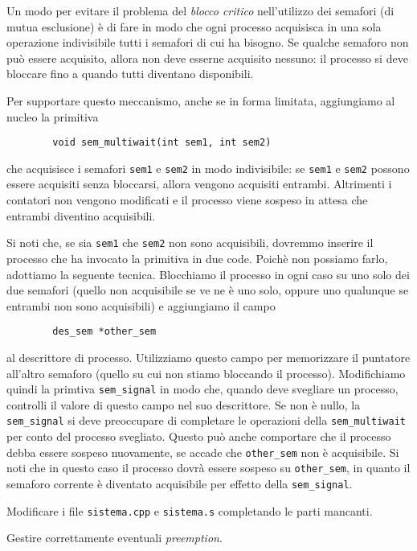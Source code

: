 Un modo per evitare il problema del {\em blocco critico} nell'utilizzo dei semafori (di mutua esclusione) \`e di
fare in modo che ogni processo acquisisca in una sola operazione indivisibile tutti i semafori di cui ha bisogno. Se qualche semaforo
non pu\`o essere acquisito, allora non deve esserne acquisito nessuno: il processo si deve bloccare fino a quando tutti
diventano disponibili.

Per supportare questo meccanismo, anche se in forma limitata, aggiungiamo al nucleo la primitiva

\begin{verbatim}
        void sem_multiwait(int sem1, int sem2)
\end{verbatim}

che acquisisce i semafori \verb|sem1| e \verb|sem2| in modo indivisibile: se \verb|sem1| e \verb|sem2| possono essere acquisiti
senza bloccarsi, allora vengono acquisiti entrambi. Altrimenti i contatori non vengono modificati e il processo viene sospeso
in attesa che entrambi diventino acquisibili.

Si noti che, se sia \verb|sem1| che \verb|sem2| non sono acquisibili, dovremmo inserire il processo che ha invocato la primitiva
in due code. Poich\`e non possiamo farlo, adottiamo la seguente tecnica. Blocchiamo il processo in ogni caso su uno solo dei
due semafori (quello non acquisibile se ve ne \`e uno solo, oppure uno qualunque se entrambi non sono acquisibili) e aggiungiamo il campo

\begin{verbatim}
        des_sem *other_sem
\end{verbatim}

al descrittore di processo. Utilizziamo questo campo per memorizzare il puntatore all'altro semaforo (quello su cui non stiamo
bloccando il processo). Modifichiamo quindi la primtiva \verb|sem_signal| in modo che, quando deve svegliare un processo,
controlli il valore di questo campo nel suo descrittore. Se non \`e nullo, la \verb|sem_signal| si deve preoccupare di completare
le operazioni della \verb|sem_multiwait| per conto del processo svegliato. Questo pu\`o anche comportare che il processo
debba essere sospeso nuovamente, se accade che \verb|other_sem| non \`e acquisibile. 
Si noti che in questo caso il processo dovr\`a essere sospeso su \verb|other_sem|, in quanto
il semaforo corrente \`e diventato acquisibile per effetto della \verb|sem_signal|.

Modificare i file \verb|sistema.cpp| e \verb|sistema.s| completando le parti mancanti.

Gestire correttamente eventuali {\em preemption}.
